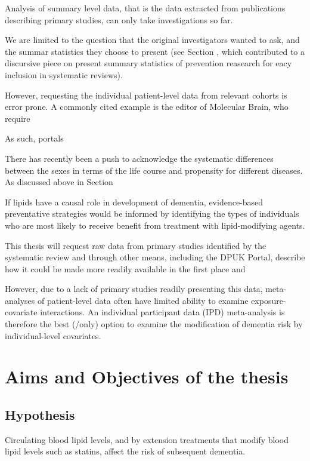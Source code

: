 \documentclass[a4paper, twoside]{templates/ociamthesis}
\begin{document}
Analysis of summary level data, that is the data extracted from publications describing primary studies, can only take investigations so far.

We are limited to the question that the original investigators wanted to ask, and the summar statistics they choose to present (see Section , which contributed to a discursive piece on present summary statistics of prevention reasearch for eacy inclusion in systematic reviews).

However, requesting the individual patient-level data from relevant cohorts is error prone. A commonly cited example is the editor of Molecular Brain, who require

As such, portals

There has recently been a push to acknowledge the systematic differences between the sexes in terms of the life course and propensity for different diseases. As discussed above in Section

If lipids have a causal role in development of dementia, evidence-based preventative strategies would be informed by identifying the types of individuals who are most likely to receive benefit from treatment with lipid-modifying agents.

This thesis will request raw data from primary studies identified by the systematic review and through other means, including the DPUK Portal, describe how it could be made more readily available in the first place and

However, due to a lack of primary studies readily presenting this data, meta-analyses of patient-level data often have limited ability to examine exposure-covariate interactions. An individual participant data (IPD) meta-analysis is therefore the best (/only) option to examine the modification of dementia risk by individual-level covariates.

\hypertarget{aims-and-objectives-of-the-thesis}{%
\section{Aims and Objectives of the thesis}\label{aims-and-objectives-of-the-thesis}}

\hypertarget{hypothesis}{%
\subsection{Hypothesis}\label{hypothesis}}

Circulating blood lipid levels, and by extension treatments that modify blood lipid levels such as statins, affect the risk of subsequent dementia.
\end{document}
